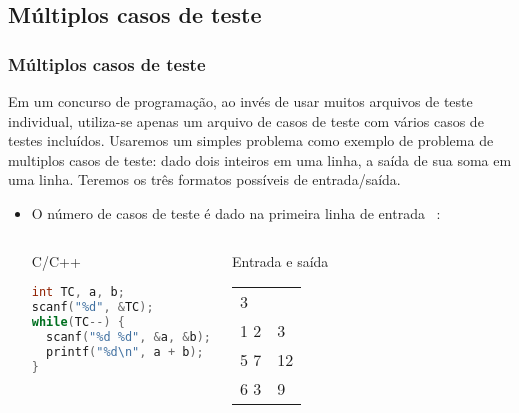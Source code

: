 \subsection{Múltiplos casos de teste}

\begin{frame} [fragile]
  \frametitle{Múltiplos casos de teste}
  {\small Em um concurso de programação, ao invés de usar muitos arquivos de teste individual, utiliza-se apenas um arquivo de casos de teste com vários casos de testes incluídos. Usaremos um simples problema como exemplo de problema de multiplos casos de teste: dado dois inteiros em uma linha, a saída de sua soma em uma linha. Teremos os três formatos possíveis de entrada/saída.}
    \begin{itemize}
      \item {\small O número de casos de teste é dado na primeira linha de entrada ~\cite{halim2013competitive}:}
      \begin{columns}
      \begin{block:ie}{C/C++}
	\begin{lstlisting}[language=c]
int TC, a, b;
scanf("%d", &TC);
while(TC--) {
  scanf("%d %d", &a, &b);
  printf("%d\n", a + b);
}
	\end{lstlisting}
      \end{block:ie}

      \begin{block:ie}{Entrada e saída}
	\begin{tabularx}{\textwidth}{|X|X|}
	  3&\\1 2&3\\5 7&12\\6 3 &9
	\end{tabularx}
      \end{block:ie}
    \end{columns}
  \end{itemize}
\end{frame}

